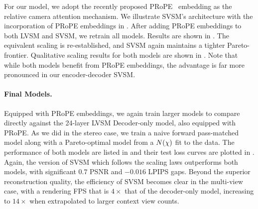 

For our model, we adopt the recently proposed PRoPE~\citep{li2025cameras} embedding as the relative camera attention mechanism. We illustrate SVSM's architecture with the incorporation of PRoPE embeddings in . After adding PRoPE embeddings to both LVSM and SVSM, we retrain all models. Results are shown in . The equivalent scaling is re-established, and SVSM again maintains a tighter Pareto-frontier. Qualitative scaling results for both models are shown in .
Note that while both models benefit from PRoPE embeddings, the advantage is far more pronounced in our encoder-decoder SVSM. 
\vspace{-1\baselineskip}

\paragraph{Final Models.}

Equipped with PRoPE embeddings, we again train larger models to compare directly against the 24-layer LVSM Decoder-only model, also equipped with PRoPE. As we did in the stereo case, we train a naive forward pass-matched model along with a Pareto-optimal model from a $N(\chi{})$ fit to the data. The performance of both models are listed in  and their test loss curves are plotted in . Again, the version of SVSM which follows the scaling laws outperforms both models, with significant $0.7$ PSNR and $-0.016$ LPIPS gaps. Beyond the superior reconstruction quality, the efficiency of SVSM becomes clear in the multi-view case, with a rendering FPS that is $4\times$ that of the decoder-only model, increasing to $14\times$ when extrapolated to larger context view counts.


